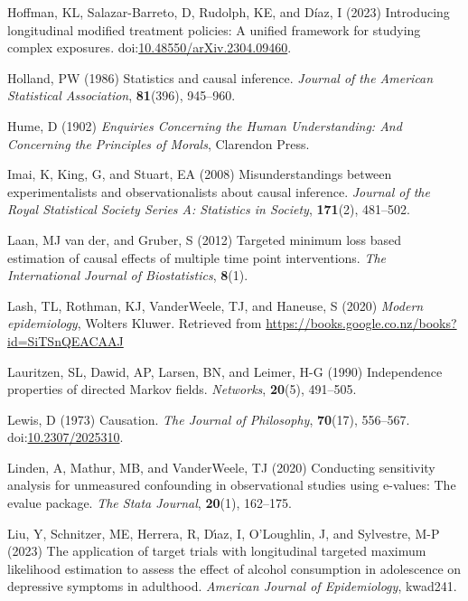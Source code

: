 \documentclass[
  single column]{article}
\newlength{\cslhangindent}
\newenvironment{CSLReferences}[2] %
 {\begin{list}{}{%
  \setlength{\itemindent}{0pt}
  \setlength{\leftmargin}{0pt}
  \setlength{\parsep}{0pt}
  \ifodd #1
   \setlength{\leftmargin}{\cslhangindent}
   \setlength{\itemindent}{-1\cslhangindent}
  \fi
  \setlength{\itemsep}{#2\baselineskip}}}
 {\end{list}}
\begin{document}
\begin{CSLReferences}{1}{0}
Hoffman, KL, Salazar-Barreto, D, Rudolph, KE, and Díaz, I (2023)
Introducing longitudinal modified treatment policies: A unified
framework for studying complex exposures.
doi:\href{https://doi.org/10.48550/arXiv.2304.09460}{10.48550/arXiv.2304.09460}.

Holland, PW (1986) Statistics and causal inference. \emph{Journal of the
American Statistical Association}, \textbf{81}(396), 945--960.

Hume, D (1902) \emph{Enquiries Concerning the Human Understanding: And
Concerning the Principles of Morals}, Clarendon Press.

Imai, K, King, G, and Stuart, EA (2008) Misunderstandings between
experimentalists and observationalists about causal inference.
\emph{Journal of the Royal Statistical Society Series A: Statistics in
Society}, \textbf{171}(2), 481--502.

Laan, MJ van der, and Gruber, S (2012) Targeted minimum loss based
estimation of causal effects of multiple time point interventions.
\emph{The International Journal of Biostatistics}, \textbf{8}(1).

Lash, TL, Rothman, KJ, VanderWeele, TJ, and Haneuse, S (2020)
\emph{Modern epidemiology}, Wolters Kluwer. Retrieved from
\url{https://books.google.co.nz/books?id=SiTSnQEACAAJ}

Lauritzen, SL, Dawid, AP, Larsen, BN, and Leimer, H-G (1990)
Independence properties of directed {M}arkov fields. \emph{Networks},
\textbf{20}(5), 491--505.

Lewis, D (1973) Causation. \emph{The Journal of Philosophy},
\textbf{70}(17), 556--567.
doi:\href{https://doi.org/10.2307/2025310}{10.2307/2025310}.

Linden, A, Mathur, MB, and VanderWeele, TJ (2020) Conducting sensitivity
analysis for unmeasured confounding in observational studies using
e-values: The evalue package. \emph{The Stata Journal}, \textbf{20}(1),
162--175.

Liu, Y, Schnitzer, ME, Herrera, R, Dı́az, I, O'Loughlin, J, and
Sylvestre, M-P (2023) The application of target trials with longitudinal
targeted maximum likelihood estimation to assess the effect of alcohol
consumption in adolescence on depressive symptoms in adulthood.
\emph{American Journal of Epidemiology}, kwad241.


\end{CSLReferences}
\end{document}
